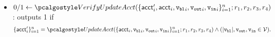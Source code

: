 \begin{itemize}

    \item $0/1 \gets \verupdacc(\{\acct_i^\prime, \acct_i, {\vbl}_i, {\vout}_i, {\vin}_i\}_{i=1}^n; r_1,r_2,r_3,r_4)$: outputs 1 if
    \begin{align*}
        \{\acct_i^\prime\}_{i=1}^n =  \updacc(\{\acct_i, {\vbl}_i, {\vout}_i, {\vin}_i\}_{i=1}^n; r_1,r_2,r_3,r_4)  \land 
                                      (|\vbl|,\vout, \vin  \in \vset).
    \end{align*}

\end{itemize}